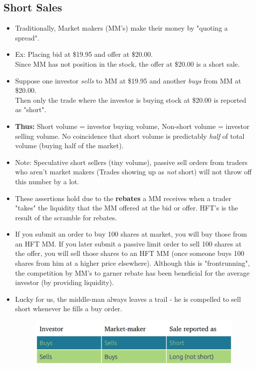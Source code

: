 \documentclass[12pt, oneside]{article}
\begin{document}
\subsection{Short Sales}
    \begin{itemize}
         \item Traditionally, Market makers (MM's) make their money by "quoting a spread".
         \item Ex: Placing bid at \$19.95 and offer at \$20.00. 
         \\Since MM has not position in the stock, the offer at \$20.00 is a short sale.
         \item Suppose one investor \textit{sells} to MM at \$19.95 and another \textit{buys} from MM at \$20.00. \\Then only the trade where the investor is buying stock at \$20.00 is reported as "short".
         \item \textbf{Thus:} Short volume = investor buying volume, Non-short volume = investor selling volume.
         No coincidence that short volume is predictably \textit{half} of total volume (buying half of the market).
         \item Note: Speculative short sellers (tiny volume), passive sell orders from traders who aren't market makers (Trades showing up as \textit{not} short) will not throw off this number by a lot.
         \item These assertions hold due to the \textbf{rebates} a MM receives when a trader "takes" the liquidity that the MM offered at the bid or offer. HFT's is the result of the scramble for rebates.
         \item If you submit an order to buy 100 shares at market, you will buy those from an HFT MM. If you later submit a passive limit order to sell 100 shares at the offer, you will sell those shares to an HFT MM (once someone buys 100 shares from him at a higher price elsewhere). Although this is "frontrunning", the competition by MM's to garner rebate has been beneficial for the average investor (by providing liquidity).
         \item Lucky for us, the middle-man always leaves a trail - he is compelled to sell short whenever he fills a buy order.
        \begin{figure}[!ht]
            \centering
            \includegraphics[width=\textwidth]{Capture.PNG}        
        \end{figure}
    \end{itemize}
\newpage
\end{document}
